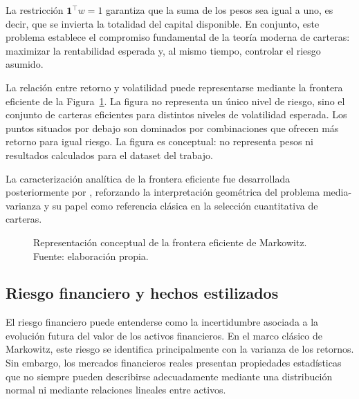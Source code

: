 La restricción $\mathbf{1}^\top w = 1$ garantiza que la suma de los pesos sea igual a uno, es decir, que se invierta la totalidad del capital disponible. En conjunto, este problema establece el compromiso fundamental de la teoría moderna de carteras: maximizar la rentabilidad esperada y, al mismo tiempo, controlar el riesgo asumido.

La relación entre retorno y volatilidad puede representarse mediante la frontera eficiente de la Figura~\ref{fig:frontera_eficiente_propia}. La figura no representa un único nivel de riesgo, sino el conjunto de carteras eficientes para distintos niveles de volatilidad esperada. Los puntos situados por debajo son dominados por combinaciones que ofrecen más retorno para igual riesgo. La figura es conceptual: no representa pesos ni resultados calculados para el dataset del trabajo.

La caracterización analítica de la frontera eficiente fue desarrollada posteriormente por \cite{merton1972analytic}, reforzando la interpretación geométrica del problema media-varianza y su papel como referencia clásica en la selección cuantitativa de carteras.

\begin{figure}[htbp]
\centering
{}
\caption{Representación conceptual de la frontera eficiente de Markowitz. Fuente: elaboración propia.}
\label{fig:frontera_eficiente_propia}
\end{figure}

\subsection{Riesgo financiero y hechos estilizados}

El riesgo financiero puede entenderse como la incertidumbre asociada a la evolución futura del valor de los activos financieros. En el marco clásico de Markowitz, este riesgo se identifica principalmente con la varianza de los retornos. Sin embargo, los mercados financieros reales presentan propiedades estadísticas que no siempre pueden describirse adecuadamente mediante una distribución normal ni mediante relaciones lineales entre activos.

